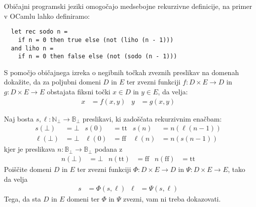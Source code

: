 \documentclass{izpit}
\begin{document}

\naloga[\tocke{25}]
Običajni programski jeziki omogočajo medsebojne rekurzivne definicije, na primer v OCamlu lahko definiramo:
\begin{verbatim}
  let rec sodo n =
    if n = 0 then true else (not (liho (n - 1)))
  and liho n =
    if n = 0 then false else (not (sodo (n - 1)))
\end{verbatim}

\podnaloga
S pomočjo običajnega izreka o negibnih točkah zveznih preslikav na domenah dokažite, da za poljubni domeni $D$ in $E$ ter zvezni funkciji $f \colon D \times E \to D$ in $g \colon D \times E \to E$ obstajata fiksni točki $x \in D$ in $y \in E$, da velja:
\begin{align*}
  x &= f(x, y) &
  y &= g(x, y)
\end{align*}
\prostor

\podnaloga
Naj bosta $s, \ell \colon \mathbb{N}_\bot \to \mathbb{B}_\bot$ preslikavi, ki zadoščata rekurzivnim enačbam:
\begin{align*}
  s(\bot) &= \bot &
  s(0) &= \mathrm{tt} &
  s(n) &= n (\ell(n - 1)) \\
  \ell(\bot) &= \bot &
  \ell(0) &= \mathrm{ff} &
  \ell(n) &= n (s(n - 1))
\end{align*}
kjer je preslikava $n \colon \mathbb{B}_\bot \to \mathbb{B}_\bot$ podana z
\begin{align*}
  n(\bot) &= \bot &
  n(\mathrm{tt}) &= \mathrm{ff} &
  n(\mathrm{ff}) &= \mathrm{tt}
\end{align*}
Poiščite domeni $D$ in $E$ ter zvezni funkciji $\Phi \colon D \times E \to D$ in $\Psi \colon D \times E \to E$, tako da velja
\begin{align*}
  s &= \Phi(s, \ell) &
  \ell &= \Psi(s, \ell)
\end{align*}
Tega, da sta $D$ in $E$ domeni ter $\Phi$ in $\Psi$ zvezni, vam ni treba dokazovati.
\prostor
\end{document}
